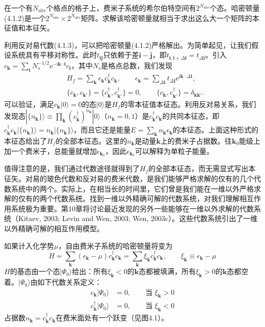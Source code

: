 在一个有$N_{\mathrm{site}}$个格点的格子上，费米子系统的希尔伯特空间有$2^{N_{\mathrm{site}}}$个态。哈密顿量(4.1.2)是一个$2^{N_{\mathrm{site}}}\times 2^{N_{\mathrm{site}}}$矩阵。求解该哈密顿量就相当于求出这么大一个矩阵的本征值和本征矢。

利用反对易代数(4.1.3)，可以把哈密顿量(4.1.2)严格解出。为简单起见，让我们假设系统具有平移对称性。此时$t_{\pmb{i}\pmb{j}}$只依赖于差$\pmb{i}-\pmb{j}$，即$t_{\pmb{i},\pmb{i}+\Delta\pmb{i}}=t_{\Delta\pmb{i}}$。引入$c_{\pmb{k}}=\sum_{\pmb{i}}N_s^{-1/2}\mathrm{e}^{-\mathrm{i}\pmb{k}\cdot\pmb{i}}c_{\pmb{i}}$，其中$N_s$是格点总数，我们发现
\begin{align*}
&H_f=\sum_{\pmb{k}}\epsilon_{\pmb{k}}c_{\pmb{k}}^{\dagger}c_{\pmb{k}},\qquad \epsilon_{\pmb{k}}=\sum_{\Delta\pmb{i}}t_{\Delta\pmb{i}}\mathrm{e}^{\mathrm{i}\pmb{k}\cdot\Delta\pmb{i}},\\
&\{c_{\pmb{k}},c_{\pmb{k}'}\}=\{c_{\pmb{k}}^{\dagger},c_{\pmb{k}'}^{\dagger}\}=0,\qquad \{c_{\pmb{k}},c_{\pmb{k}'}^{\dagger}\}=\delta_{\pmb{k}\pmb{k}'}.\tag{4.1.4}
\end{align*}
可以验证，满足$c_{\pmb{k}}|0\rangle=0$的态$|0\rangle$是$H_f$的零本征值本征态。利用反对易关系，我们发现态$|\{n_{\pmb{k}}\}\rangle\equiv\prod_{\pmb{k}}(c_{\pmb{k}}^{\dagger})^{n_{\pmb{k}}}|0\rangle$（$n_{\pmb{k}}=0,1$）是$c_{\pmb{k}}^{\dagger}c_{\pmb{k}}$的共同本征态，即$c_{\pmb{k}}^{\dagger}c_{\pmb{k}}|\{n_{\pmb{k}}\}\rangle=n_{\pmb{k}}|\{n_{\pmb{k}}\}\rangle$，而且它还是能量$E=\sum_{\pmb{k}}n_{\pmb{k}}\epsilon_{\pmb{k}}$的本征态。上面这种形式的本征态给出了$H_f$的全部本征态。这里的$n_{\pmb{k}}$是动量$\pmb{k}$上的费米子占据数。往$\pmb{k}_0$能级上加一个费米子，总能量就增加$\epsilon_{\pmb{k}_0}$，因此$\epsilon_{\pmb{k}_0}$可以解释为单粒子能量。

值得注意的是，我们通过代数途径就得到了$H_f$的全部本征态，而无需显式写出本征矢。对易的玻色代数和反对易的费米代数，是我们能够严格求解的仅有的几个代数系统中的两个。实际上，在相当长的时间里，它们曾是我们能在一维以外严格求解的仅有的两个代数系统。找到一维以外精确可解的代数系统，对我们理解相互作用系统极为重要。第10章将讨论最近发现的另外一些能够在一维以外求解的代数系统（Kitaev, 2003; Levin and Wen, 2003; Wen, 2003c）。这些代数系统引出了一维以外精确可解的相互作用模型。

如果计入化学势$\mu$，自由费米子系统的哈密顿量将变为
\begin{equation*}
H=\sum_{\pmb{k}}(\epsilon_{\pmb{k}}-\mu)c_{\pmb{k}}^{\dagger}c_{\pmb{k}}=\sum_{\pmb{k}}\xi_{\pmb{k}}c_{\pmb{k}}^{\dagger}c_{\pmb{k}},\qquad \xi_{\pmb{k}}\equiv\epsilon_{\pmb{k}}-\mu\tag{4.1.5}
\end{equation*}
$H$的基态由一个态$|\Psi_0\rangle$给出：所有$\xi_{\pmb{k}}<0$的$\pmb{k}$态都被填满，所有$\xi_{\pmb{k}}>0$的$\pmb{k}$态都空着。$|\Psi_0\rangle$由如下代数关系定义：
\begin{equation*}
\begin{aligned}
c_{\pmb{k}}|\Psi_0\rangle&=0,\qquad \text{当 }\xi_{\pmb{k}}>0\\
c_{\pmb{k}}^{\dagger}|\Psi_0\rangle&=0,\qquad \text{当 }\xi_{\pmb{k}}<0
\end{aligned}
\end{equation*}
占据数$n_{\pmb{k}}=c_{\pmb{k}}^{\dagger}c_{\pmb{k}}$在费米面处有一个跃变（见图4.1）。

